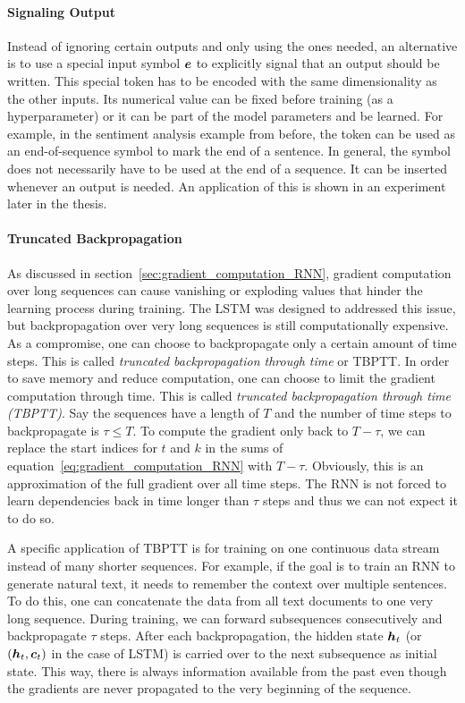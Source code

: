 		\paragraph{Signaling Output} 
		Instead of ignoring certain outputs and only using the ones needed, an alternative is to use a special input symbol $\bm{e}$ to explicitly signal that an output should be written.
		This special token has to be encoded with the same dimensionality as the other inputs. 
		Its numerical value can be fixed before training (as a hyperparameter) or it can be part of the model parameters and be learned.
		For example, in the sentiment analysis example from before, the token can be used as an end-of-sequence symbol to mark the end of a sentence.
		In general, the symbol does not necessarily have to be used at the end of a sequence.
		It can be inserted whenever an output is needed.
		An application of this is shown in an experiment later in the thesis. 
		
		\paragraph{Truncated Backpropagation}
		As discussed in section~\ref{sec:gradient_computation_RNN}, gradient computation over long sequences can cause vanishing or exploding values that hinder the learning process during training.
		The LSTM was designed to addressed this issue, but backpropagation over very long sequences is still computationally expensive.
		As a compromise, one can choose to backpropagate only a certain amount of time steps.
		This is called \emph{truncated backpropagation through time} or TBPTT.
		In order to save memory and reduce computation, one can choose to limit the gradient computation through time.
		This is called \emph{truncated backpropagation through time (TBPTT)}. 
		Say the sequences have a length of $T$ and the number of time steps to backpropagate is $\tau \leq T$.
		To compute the gradient only back to $T - \tau$, we can replace the start indices for $t$ and $k$ in the sums of equation~\ref{eq:gradient_computation_RNN} with $T - \tau$.
		Obviously, this is an approximation of the full gradient over all time steps.
		The RNN is not forced to learn dependencies back in time longer than $\tau$ steps and thus we can not expect it to do so.
		
		A specific application of TBPTT is for training on one continuous data stream instead of many shorter sequences.
		For example, if the goal is to train an RNN to generate natural text, it needs to remember the context over multiple sentences.
		To do this, one can concatenate the data from all text documents to one very long sequence.
		During training, we can forward subsequences consecutively and backpropagate $\tau$ steps.
		After each backpropagation, the hidden state $\bm{h}_t$ (or $(\bm{h}_t, \bm{c}_t)$ in the case of LSTM) is carried over to the next subsequence as initial state.
		This way, there is always information available from the past even though the gradients are never propagated to the very beginning of the sequence.
		
